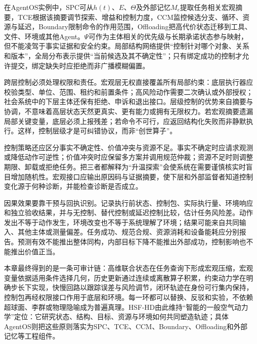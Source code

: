 在AgentOS实例中，SPC可从$h(t)$、$E$、$\Theta$及外部记忆$M_e$提取任务相关宏观摘要，TCE根据该摘要调节探索、增益和控制力度，CCM监控候选分支、循环、资源与延迟，Boundary限制命令的作用范围，Offloading把高代价状态迁移到工具、文件、环境或其他Agent。$\Psi$可作为主体相关的优先级与长期承诺状态参与映射，但不能凌驾于事实证据和安全约束。局部结构网络提供“控制针对哪个对象、关系和版本”，全局分布表示提供“当前候选及其不确定性”；只有绑定成功的控制才允许提交，绑定缺失时应拒绝而非广播模糊偏置。

跨层控制必须处理权限和责任。宏观层无权直接覆盖所有局部约束：底层执行器应校验类型、单位、范围、租约和前置条件；高风险动作需要二次确认或外部授权；社会系统中的下层主体还保有拒绝、申诉和退出接口。层级控制的优势来自摘要与协调，不意味着高层状态天然更真实、更有能力或拥有无限权力。若宏观摘要遗漏局部关键变量，底层必须上报残差；若命令不可行，应返回结构化失败而非静默执行。这样，控制层级才是可纠错协议，而非“创世算子”。

控制策略还应区分事实不确定性、价值冲突与资源不足。事实不确定时应请求观测或降低动作可逆性；价值冲突时应保留多方案并调用规范仲裁；资源不足时则调整期限、卸载或拒绝任务。把三者都解释为“升温探索”会使系统在需要谨慎核实时盲目增加随机性。宏观接口应输出原因码与证据摘要，使下层和外部监督者知道控制变化源于何种诊断，并能检查诊断是否成立。

因果效果要靠干预与回执识别。记录执行前状态、控制包、实际执行量、环境响应和独立验收结果，并与无控制、替代控制或延迟控制比较，估计任务风险差。动作发出不等于动作发生，环境改变也不等于系统理解了环境；结果可能来自共同输入、其他主体或测量偏差。任务成功、规范合规、资源消耗和设备能耗应分别报告。预测有效不能推出整体同构，内部目标下降不能推出外部成功，控制影响也不能推出价值正当。

本章最终得到的是一条可审计链：高维联合状态在任务查询下形成宏观压缩，宏观变量依据适用条件选择几何，历史更新通过连续或离散算子积累，约束动力学在明确步长下实现，快慢回路以跟踪误差与风险调节，闭环轨迹在身份可行集内保持，控制包再经权限接口作用于底层和环境。每一环都可以替换、反驳和实验，不依赖超球面、李群或物理隐喻成为普遍真理。HSF-HD由此维持“智能的一般空气动力学”定位：它研究状态、结构、目标、资源与环境如何共同塑造轨迹；具体AgentOS则把这些原则落实为SPC、TCE、CCM、Boundary、Offloading和外部记忆等工程组件。

